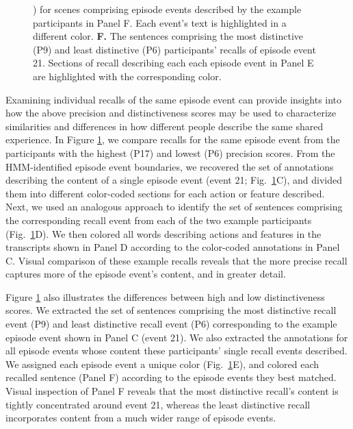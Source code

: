 \documentclass[10pt]{article}
\renewcommand{\includegraphics}[2][]{} %
\providecommand{\DIFaddtex}[1]{{\protect\color{blue}\uwave{#1}}} %
\providecommand{\DIFaddFL}[1]{\DIFadd{#1}} %
\providecommand{\DIFaddbeginFL}{} %
\providecommand{\DIFaddendFL}{} %
\providecommand{\DIFdelendFL}{} %
\providecommand{\DIFadd}[1]{\texorpdfstring{\DIFaddtex{#1}}{#1}} %
\newcommand{\DIFaddincludegraphics}[2][]{{\color{blue}\fbox{\DIFOincludegraphics[#1]{#2}}}} %
\DeclareRobustCommand{\DIFaddbeginFL}{\DIFOaddbeginFL \let\includegraphics\DIFaddincludegraphics} %
\DeclareRobustCommand{\DIFaddendFL}{\DIFOaddendFL \let\includegraphics\DIFOincludegraphics} %
\DeclareRobustCommand{\DIFdelendFL}{\DIFOaddendFL \let\includegraphics\DIFOincludegraphics} %
\begin{document}
\begin{figure}
{{{\citealp{ChenEtal17}}\hspace{0pt}%
) }\DIFdelendFL \DIFaddbeginFL \DIFaddFL{~\mbox{%
\citep{ChenEtal17} }\hspace{0pt}%
}\DIFaddendFL for scenes comprising episode events described by the example participants in Panel F.  Each event's text is highlighted in a different color.  \textbf{F.} The sentences comprising the most distinctive (P9) and least distinctive (P6) participants' recalls of episode event 21.  Sections of recall describing each each episode event in Panel E are highlighted with the corresponding color.}
  \label{fig:precision-detail}

\end{figure}


Examining individual recalls of the same episode event can provide insights into how the above precision and distinctiveness scores may be used to characterize similarities and differences in how different people describe the same shared experience.  In Figure \ref{fig:precision-detail}, we compare recalls for the same episode event from the participants with the highest (P17) and lowest (P6) precision scores.  From the HMM-identified episode event boundaries, we recovered the set of annotations describing the content of a single episode event (event 21; Fig.~\ref{fig:precision-detail}C), and divided them into different color-coded sections for each action or feature described.  Next, we used an analogous approach to identify the set of sentences comprising the corresponding recall event from each of the two example participants (Fig.~\ref{fig:precision-detail}D).  We then colored all words describing actions and features in the transcripts shown in Panel D according to the color-coded annotations in Panel C.  Visual comparison of these example recalls reveals that the more precise recall captures more of the episode event's content, and in greater detail.

Figure \ref{fig:precision-detail} also illustrates the differences between high and low distinctiveness scores.  We extracted the set of sentences comprising the most distinctive recall event (P9) and least distinctive recall event (P6) corresponding to the example episode event shown in Panel C (event 21).  We also extracted the annotations for all episode events whose content these participants' single recall events described.  We assigned each episode event a unique color (Fig.~\ref{fig:precision-detail}E), and colored each recalled sentence (Panel F) according to the episode events they best matched.  Visual inspection of Panel F reveals that the most distinctive recall's content is tightly concentrated around event 21, whereas the least distinctive recall incorporates content from a much wider range of episode events.
\end{document}
